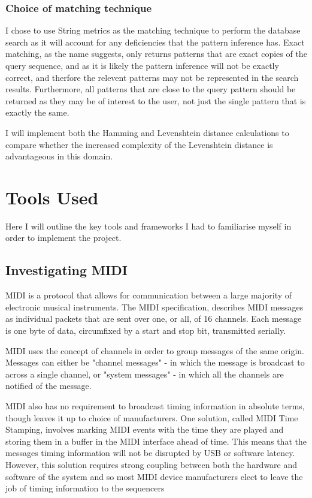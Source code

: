 \documentclass[12pt,twoside,notitlepage]{report}
\begin{document}
			
			\subsubsection{Choice of matching technique}
			I chose to use String metrics as the matching technique to perform the database search as it will account for any deficiencies that the pattern inference has. Exact matching, as the name suggests, only returns patterns that are exact copies of the query sequence, and as it is likely the pattern inference will not be exactly correct, and therfore the relevent patterns may not be represented in the search results. Furthermore, all patterns that are close to the query pattern should be returned as they may be of interest to the user, not just the single pattern that is exactly the same.
			
			I will implement both the Hamming and Levenshtein distance calculations to compare whether the increased complexity of the Levenshtein distance is advantageous in this domain.

	\section{Tools Used}
	Here I will outline the key tools and frameworks I had to familiarise myself in order to implement the project.
		\subsection{\label{Midi}Investigating MIDI}
		MIDI is a protocol that allows for communication between a large majority of electronic musical instruments. The MIDI specification\cite{MIDI}, describes MIDI messages as individual packets that are sent over one, or all, of 16 channels. Each message is one byte of data, circumfixed by a start and stop bit, transmitted serially. 		
	

		MIDI uses the concept of channels in order to group messages of the same origin. Messages can either be "channel messages" - in which the message is broadcast to across a single channel, or "system messages" - in which all the channels are notified of the message.
		
		MIDI also has no requirement to broadcast timing information in absolute terms, though leaves it up to choice of manufacturers. One solution, called MIDI Time Stamping\cite{Walker2007}, involves marking MIDI events with the time they are played and storing them in a buffer in the MIDI interface ahead of time. This means that the messages timing information will not be disrupted by USB or software latency. However, this solution requires strong coupling between both the hardware and software of the system and so most MIDI device manufacturers elect to leave the job of timing information to the sequencers
		
\end{document}
